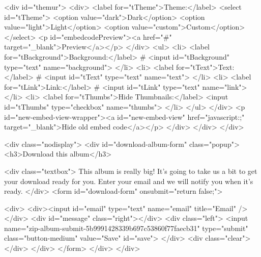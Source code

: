             <div id="themur">
                <div>
                    <label for="tTheme">Theme:</label>
                    <select id="tTheme">
                        <option value="dark">Dark</option>
                        <option value="light">Light</option>
                        <option value="custom">Custom</option>
                    </select>
                    <p id="embedcodePreview"><a href="#" target="_blank">Preview</a></p>
                </div>
                <ul>
                    <li>
                        <label for="tBackground">Background:</label> # <input id="tBackground" type="text" name="background">
                    </li>
                    <li>
                        <label for="tText">Text:</label> # <input id="tText" type="text" name="text">
                    </li>
                    <li>
                        <label for="tLink">Link:</label> # <input id="tLink" type="text" name="link">
                    </li>
                    <li>
                        <label for="tThumbs">Hide Thumbnails:</label> <input id="tThumbs" type="checkbox" name="thumbs">
                    </li>
                </ul>
            </div>
            <p id="new-embed-view-wrapper"><a id="new-embed-view" href="javascript:;" target="_blank">Hide old embed code</a></p>
        </div>
    </div>
</div>

    <div class="nodisplay">
	<div id="download-album-form" class="popup">
		<h3>Download this album</h3>
		
		<div class="textbox">
			This album is really big! It's going to take us a bit to get your download ready for you.  Enter your email and we will notify you when it's ready.
		</div>
        <form id="download-form" onsubmit="return false;">
		
		<div>
            <div><input id="email" type="text" name="email" title="Email" /></div>
            <div id="message" class="right"></div>
            <div class="left">
                <input name="zip-album-submit-5b9991428339b697c53860f77faecb31" type="submit" class="button-medium" value="Save" id="save">
            </div>
            <div class="clear"></div>
        </div>
        </form>
	</div>
</div>

